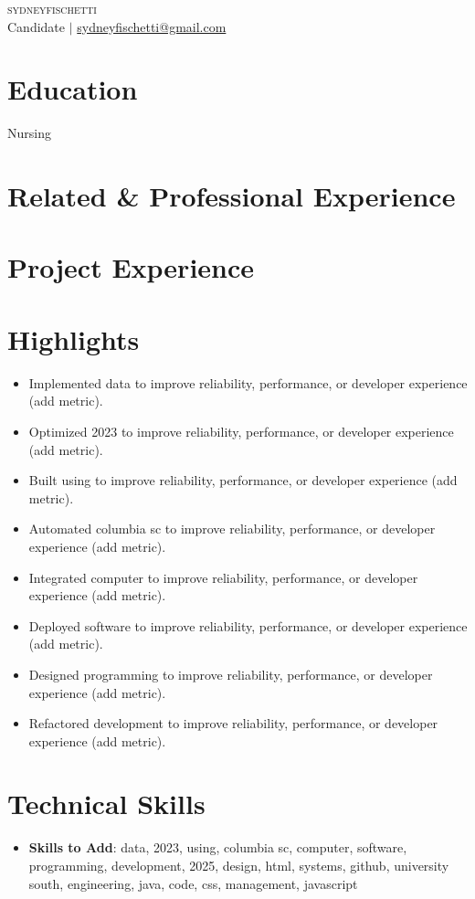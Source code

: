 \documentclass[letterpaper,11pt]{article}
\begin{document}
\begin{center}
{\Huge \scshape sydneyfischetti} \\ \vspace{1pt}
Candidate $|$ \href{mailto:sydneyfischetti@gmail.com}{sydneyfischetti@gmail.com}
\end{center}

\section{Education}

{\small Nursing}\par

\section{Related \& Professional Experience}

{\small }\par

\section{Project Experience}

{\small }\par

\section{Highlights}
\begin{itemize}[leftmargin=0.15in]\item Implemented data to improve reliability, performance, or developer experience (add metric).
\item Optimized 2023 to improve reliability, performance, or developer experience (add metric).
\item Built using to improve reliability, performance, or developer experience (add metric).
\item Automated columbia sc to improve reliability, performance, or developer experience (add metric).
\item Integrated computer to improve reliability, performance, or developer experience (add metric).
\item Deployed software to improve reliability, performance, or developer experience (add metric).
\item Designed programming to improve reliability, performance, or developer experience (add metric).
\item Refactored development to improve reliability, performance, or developer experience (add metric).\end{itemize}

\section{Technical Skills}

\begin{itemize}[leftmargin=0.15in]
\item \textbf{Skills to Add}{: data, 2023, using, columbia sc, computer, software, programming, development, 2025, design, html, systems, github, university south, engineering, java, code, css, management, javascript}
\end{itemize}
\end{document}
